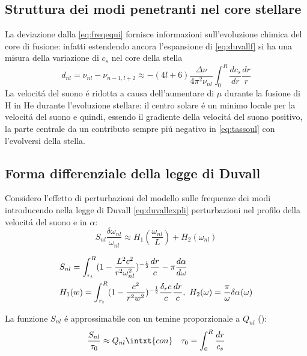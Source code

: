 {\subsection{Struttura dei modi penetranti nel core stellare}

La deviazione dalla \eqref{eq:freqequi} fornisce informazioni sull'evoluzione chimica del core di fusione: infatti estendendo ancora l'espansione di \eqref{eq:duvallf} si ha una misura della variazione di $c_s$ nel core della stella
\begin{equation}\label{eq:tassoul}
    d_{nl}=\nu_{nl}-\nu_{n-1,l+2}\approx-(4l+6)\frac{\Delta\nu}{4\pi^2\nu_{nl}}\int_0^R\frac{dc_s}{dr}\frac{dr}{r}
\end{equation}
La velocit\'a del suono \'e ridotta a causa dell'aumentare di $\mu$ durante la fusione di H in He durante l'evoluzione stellare: il centro solare \'e un minimo locale per la velocit\'a del suono e quindi, essendo il gradiente della velocit\'a del suono positivo, la parte centrale da un contributo sempre pi\'u negativo in \eqref{eq:tassoul} con l'evolversi della stella.

\subsection{Forma differenziale della legge di Duvall}

Considero l'effetto di perturbazioni del modello sulle frequenze dei modi introducendo nella legge di Duvall \eqref{eq:duvallexpli} perturbazioni nel profilo della velocit\'a del suono e in $\alpha$:
\begin{equation}
S_{nl}\frac{\delta\omega_{nl}}{\omega_{nl}}\approx H_1(\frac{\omega_{nl}}{L})+H_2(\omega_{nl})\label{eq:Dlinear}
\end{equation}

\begin{align}
&S_{nl}=\int_{r_t}^R(1-\frac{L^2c^2}{r^2\omega_{nl}^2})\expy{-\frac{1}{2}}\frac{dr}{c}-\pi\TDy{\omega}{\alpha}\\
&H_1(w)=\int_{r_t}^R(1-\frac{c^2}{r^2w^2})\expy{-\frac{1}{2}}\frac{\delta_rc}{c}\frac{dr}{c},\ H_2(\omega)=\frac{\pi}{\omega}\delta\alpha(\omega)
\end{align}

La funzione $S_{nl}$ \'e approssimabile con un temine proporzionale a $Q_{nl}$ (\cite{christensen1991solar}):
\begin{align}
&\frac{S_{nl}}{\tau_0}\approx Q_{nl}\intxt{con}
&\tau_0=\int_{0}^R\frac{dr}{c_s}
\end{align}

}
